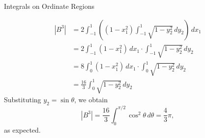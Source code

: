 \documentclass[smaller,hyperref={CJKbookmarks=true}]{beamer}
\begin{document}
\begin{frame}{Integrals on Ordinate Regions}
\begin{spacing}{0.7}
\begin{equation*}
  \begin{split}
     |B^3| &=2\int_{-1}^{1}\left((1-x_1^2)\int_{-1}^{1}
     \sqrt{1-y_2^2}\,dy_2\right)\,dx_1 \\
       &=2\int_{-1}^{1}(1-x_1^2)\,dx_1\cdot
       \int_{-1}^{1}\sqrt{1-y_2^2}\,dy_2 \\
       &=8\int_{0}^{1}(1-x_1^2)\,dx_1\cdot\int_{0}^{1}
       \sqrt{1-y_2^2}\,dy_2 \\
       &=\frac{16}{3}\int_{0}^{1}\sqrt{1-y_2^2}\,dy_2
  \end{split}
\end{equation*}
Substituting $y_2=\sin\theta$, we obtain
\[|B^3|=\frac{16}{3}\int_{0}^{\pi/2}\cos^2\theta\,d\theta
=\frac{4}{3}\pi,\]
as expected.
\end{spacing}
\end{frame}
\end{document}
